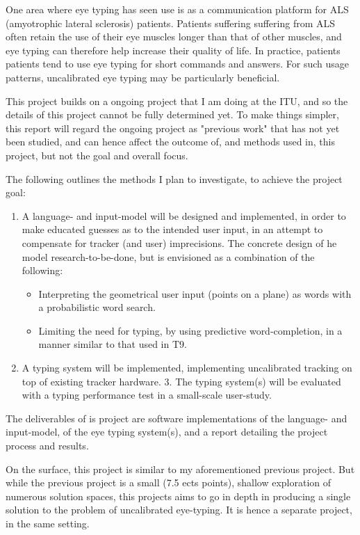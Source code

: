 \documentclass[a4paper, titlepage, 12pt, draft]{article}
\renewcommand{\%}{\scalebox{.9}{\oldpct}}
\begin{document}
One area where eye typing has seen use is as a communication platform for ALS
(amyotrophic lateral sclerosis) patients. Patients suffering suffering from ALS
often retain the use of their eye muscles longer than that of other muscles, and
eye typing can therefore help increase their quality of life. In practice,
patients patients tend to use eye typing for short commands and answers. For
such usage patterns, uncalibrated eye typing may be particularly beneficial.

This project builds on a ongoing project that I am doing at the ITU, and so the
details of this project cannot be fully determined yet. To make things simpler,
this report will regard the ongoing project as "previous work" that has not yet
been studied, and can hence affect the outcome of, and methods used in, this
project, but not the goal and overall focus.

The following outlines the methods I plan to investigate, to achieve the project
goal:

\begin{enumerate}
\item A language- and input-model will be designed and implemented, in order to
make educated guesses as to the intended user input, in an attempt to compensate
for tracker (and user) imprecisions. The concrete design of he model
research-to-be-done, but is envisioned as a combination of the following:
\begin{itemize}
    \item Interpreting the geometrical user input (points on a plane) as words with a
    probabilistic word search.
    \item Limiting the need for typing, by using predictive word-completion, in a
      manner similar to that used in T9.
\end{itemize}
\item A typing system will be implemented, implementing uncalibrated tracking on
top of existing tracker hardware.
3. The typing system(s) will be
evaluated with a typing performance test in a small-scale user-study.
\end{enumerate}

The deliverables of is project are software implementations of the language- and
input-model, of the eye typing system(s), and a report detailing the project
process and results.

On the surface, this project is similar to my aforementioned previous project. But while the
previous project is a small (7.5 ects points), shallow exploration of numerous
solution spaces, this projects aims to go in depth in producing a single
solution to the problem of uncalibrated eye-typing. It is hence a separate
project, in the same setting.
\end{document}
